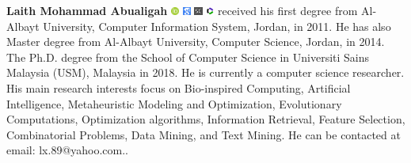 \documentclass{iaesarticle}
\begin{document}
\begin{biography}
\textbf{Laith Mohammad Abualigah} %
\href{https://orcid.org/0000-0002-2203-4549}{\includegraphics[width=0.02\textwidth]{orcid.png}} 
\href{https://scholar.google.com/citations?user=39g8fyoAAAAJ&hl=id&oi=sra}{\includegraphics[width=0.02\textwidth]{gscholar.png}}
\href{https://www.scopus.com/authid/detail.uri?authorId=57190984712}{\includegraphics[width=0.02\textwidth]{scopus.png}}
\href{https://www.webofscience.com/wos/author/rid/ABC-9695-2020/}{\includegraphics[width=0.02\textwidth]{wos.png}} received his first degree from Al-Albayt University, Computer Information System, Jordan, in 2011. He has also Master degree from Al-Albayt University, Computer Science, Jordan, in 2014. The Ph.D. degree from the School of Computer Science in Universiti Sains Malaysia (USM), Malaysia in 2018. He is currently a computer science researcher. His main research interests focus on Bio-inspired Computing, Artificial Intelligence, Metaheuristic Modeling and Optimization, Evolutionary Computations, Optimization algorithms, Information Retrieval, Feature Selection, Combinatorial Problems, Data Mining, and Text Mining. He can be contacted at email: lx.89@yahoo.com..
\end{biography}
\newpage
\end{document}
